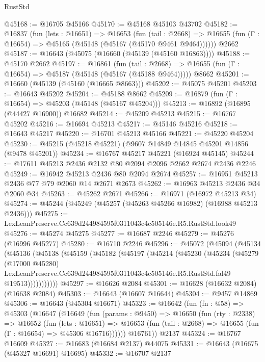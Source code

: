 \begin{lexlean}{RustStd}
\begin{coremodule}
@45168 := @16705 @45166
@45170 := @45168 @45103 @43702
@45182 := @16837
    (fun (lets : @16651) =>
    @16653
      (fun (tail : @2668) =>
      @16655 (fun (Γ : @16654) => @45165 (@45148 (@45167 (@45170 @9461 @9464))))))
    @2662
@45187 := @16643 (@45075 (@16660 (@45139 (@45160 @16863))))
@45188 := @45170 @2662
@45197 := @16861
    (fun (tail : @2668) => @16655 (fun (Γ : @16654) => @45187 (@45148 (@45167 (@45188 @9464)))))
    @8662
@45201 := @16660 (@45139 (@45160 (@16665 @8663)))
@45202 := @45075 @45201
@45203 := @16643 @45202
@45204 := @45188 @8662
@45209 := @16879 (fun (Γ : @16654) => @45203 (@45148 (@45167 @45204)))
@45213 := @16892 (@16895 (@44427 @16900)) @16682
@45214 := @45209 @45213
@45215 := @16767 @45202
@45216 := @16694 @45213
@45217 := @45146 @45216
@45218 := @16643 @45217
@45220 := @16701 @45213 @45166
@45221 := @45220 @45204
@45230 := @45215 (@45218 @45221) (@9607 @14849 @14845 @45201 @14856 (@9478 @45201))
@45234 := @16767 @45217 @45221 (@16924 @45145)
@45244 := @17611 @45213 @2436 @2132 @80 @2094 @2096 @2662 @2674 @2436 @2246
@45249 := @16942 @45213 @2436 @80 @2094 @2674
@45257 := @16951 @45213 @2436 @77 @79 @2060 @14 @2671 @2673
@45262 := @16963 @45213 @2436 @34 @2060 @34
@45263 := @45262 @2671
@45266 := @16971 (@16972 @45213 @34)
@45274 := @45244 (@45249 (@45257 (@45263 @45266 @16982) (@16988 @45213 @2436)))
@45275 := LexLeanPreserve.Cc639d244984595f0311043c4c505146e.R5.RustStd.look49
@45276 := @45274 @45275
@45277 := @16687 @2246
@45279 := @45276 (@16996 @45277)
@45280 := @16710 @2246
@45296 := @45072
    (@45094
      (@45134
        (@45136
          (@45138
            (@45159
              (@45182
                (@45197
                  (@45214
                    (@45230
                      (@45234
                        (@45279
                          (@17000 @45280)
                          LexLeanPreserve.Cc639d244984595f0311043c4c505146e.R5.RustStd.fal49
                          @19513)))))))))))
@45297 := @16626 @2084
@45301 := @16628 (@16632 @2084) (@16638 @2084)
@45303 := @16643 (@16607 @16644)
@45304 := @9457 @14869
@45306 := @16643 (@45304 @16671)
@45323 := @16642
    (fun (fn : @58) =>
    @45303
      (@16647
        (@16649
          (fun (params : @9450) =>
          @16650
            (fun (rty : @2338) =>
            @16652
              (fun (lets : @16651) =>
              @16653 (fun (tail : @2668) => @16655 (fun (Γ : @16654) => @45306 @16716))))))
        @16761))
    @2137
@45324 := @16767 @16609
@45327 := @16683 (@16684 @2137) @44075
@45331 := @16643 (@16675 (@45327 @16691) @16695)
@45332 := @16707 @2137

\end{coremodule}
\end{lexlean}

